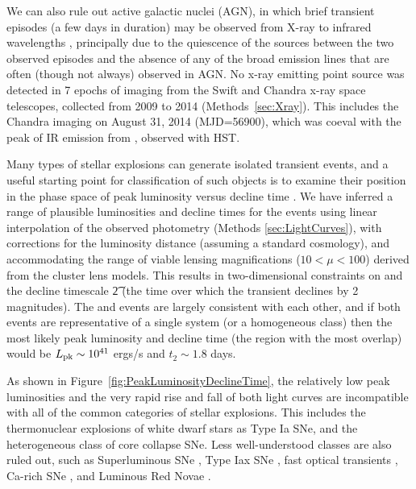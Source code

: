 We can also rule out active galactic nuclei (AGN), in which
brief transient episodes (a few days in duration) may be observed from
X-ray to infrared wavelengths \citep[e.g.][]{Gaskell:2003},
principally due to the quiescence of the \spock sources between the
two observed episodes and the absence of any of the broad emission
lines that are often (though not always) observed in AGN.  No x-ray
emitting point source was detected in 7 epochs of imaging from
the Swift and Chandra x-ray space telescopes, collected from 2009 to
2014 (Methods~\ref{sec:Xray}).  This includes the Chandra imaging on
August 31, 2014 (MJD=56900), which was coeval with the peak
of IR emission from \spocktwo, observed with HST.

Many types of stellar explosions can generate isolated
transient events, and a useful starting point for classification of
such objects is to examine their position in the phase
space of peak luminosity versus decline time \citep[see,
  e.g.,][]{Kulkarni:2007}. We have inferred a range of plausible
luminosities and decline times for the \spock events using linear
interpolation of the observed photometry (Methods
\ref{sec:LightCurves}), with corrections for the luminosity distance
(assuming a standard \LCDM cosmology), and accommodating the range of
viable lensing magnifications ($10<\mu<100$) derived from the cluster
lens models. This results in two-dimensional constraints on \Lpk and
the decline timescale \t2 (the time over which the transient declines
by 2 magnitudes). The \spockone and \spocktwo events are largely
consistent with each other, and if both events are representative of a
single system (or a homogeneous class) then the most likely peak
luminosity and decline time (the region with the most overlap) would
be $L_{\rm pk}\sim10^{41}$ ergs/s and $t_2\sim1.8$ days.

As shown in Figure~\ref{fig:PeakLuminosityDeclineTime}, the relatively
low peak luminosities and the very rapid rise and fall of both \spock
light curves are incompatible with all of the common categories of
stellar explosions. This includes the thermonuclear explosions of
white dwarf stars as Type Ia SNe, and the heterogeneous class of
core collapse SNe.  Less well-understood classes are also
ruled out, such as Superluminous SNe \citep{Gal-Yam:2012,Arcavi:2016},
Type Iax SNe \citep{Foley:2013a}, fast optical transients
\citep{Drout:2014}, Ca-rich SNe
\citep{Filippenko:2003,Perets:2011,Kasliwal:2012}, and Luminous Red
Novae \citep[also called intermediate luminosity red
  transients;][]{Munari:2002,Kulkarni:2007,Kasliwal:2011b}.

